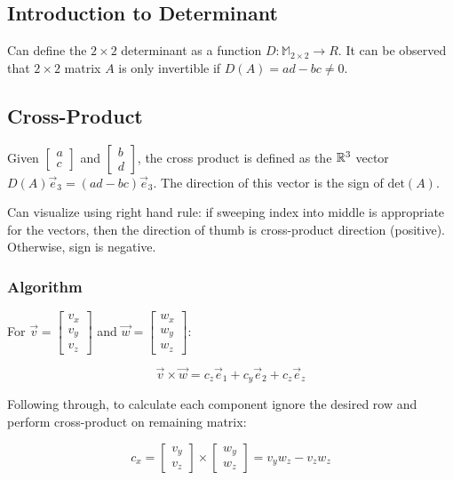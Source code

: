 \subsection{Introduction to Determinant}

Can define the $2\times 2$ determinant as a function $D:\mathbb{M}_{2\times2}\rightarrow R$.
It can be observed that $2\times 2$ matrix $A$ is only invertible if $D(A)=ad-bc\neq 0$.

\subsection{Cross-Product}

Given $\begin{bmatrix}a\\ c\end{bmatrix}$ and $\begin{bmatrix}b\\ d\end{bmatrix}$, the cross
product is defined as the $\mathbb{R}^3$ vector $D(A)\vec{e}_3=(ad-bc)\vec{e}_3$. The direction
of this vector is the sign of $\mathrm{det}(A)$.

\noindent
Can visualize using right hand rule: if sweeping index into middle is appropriate for the vectors,
then the direction of thumb is cross-product direction (positive). Otherwise, sign is negative.

\subsubsection{Algorithm}

For $\vec{v}=\begin{bmatrix}v_x\\ v_y\\ v_z\end{bmatrix}$ and $\vec{w}=\begin{bmatrix}w_x\\ w_y\\ w_z\end{bmatrix}$:

\[\boxed{\vec{v}\times\vec{w}=c_z\vec{e}_1+c_y\vec{e}_2+c_z\vec{e}_z}\]

Following through, to calculate each component ignore the desired row and perform cross-product on remaining matrix:

\[c_x=\begin{bmatrix}v_y\\ v_z\end{bmatrix}\times \begin{bmatrix}w_y\\ w_z\end{bmatrix}=v_yw_z-v_zw_z\]

